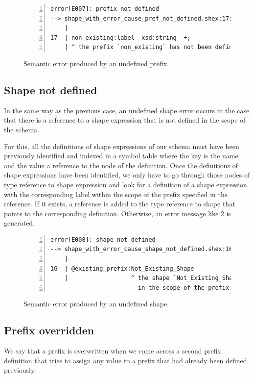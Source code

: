 \begin{figure}
    \begin{lstlisting}[numbers=left,basicstyle=\ttfamily\scriptsize]
error[E007]: prefix not defined
--> shape_with_error_cause_pref_not_defined.shex:17:3
    |
17  | non_existing:label  xsd:string  +;
    | ^ the prefix `non_existing` has not been defined
    \end{lstlisting}
    \caption[Semantic error produced by an undefined prefix]{Semantic error produced by an undefined prefix.}
    \label{fig:err-non-def-pref}
\end{figure}

\subsection{Shape not defined}
In the same way as the previous case, an undefined shape error occurs in the case that there is a reference to a shape
expression that is not defined in the scope of the schema.

For this, all the definitions of shape expressions of our schema must have been previously identified and indexed in
a symbol table where the key is the name and the value a reference to the node of the definition. Once the definitions
of shape expressions have been identified, we only have to go through those nodes of type reference to shape expression
and look for a definition of a shape expression with the corresponding label within the scope of the prefix specified
in the reference. If it exists, a reference is added to the type reference to shape that points to the corresponding
definition. Otherwise, an error message like \cref{fig:err-non-def-shape} is generated.

\begin{figure}
    \begin{lstlisting}[numbers=left,basicstyle=\ttfamily\scriptsize]
error[E008]: shape not defined
--> shape_with_error_cause_shape_not_defined.shex:16:13
    |
16  | @existing_prefix:Not_Existing_Shape
    |                  ^ the shape `Not_Existing_Shape` has not been defined
                         in the scope of the prefix `existing_prefix`
    \end{lstlisting}
    \caption[Semantic error produced by an undefined shape]{Semantic error produced by an undefined shape.}
    \label{fig:err-non-def-shape}
\end{figure}

\subsection{Prefix overridden}
We say that a prefix is overwritten when we come across a second prefix definition that tries to assign any
value to a prefix that had already been defined previously.

